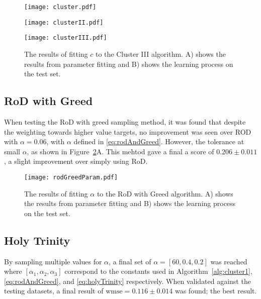 \begin{figure}[H]
    \begin{center}
        \texttt{[image: cluster.pdf]}
    \end{center}
\end{figure}
\begin{figure}[H]
    \begin{center}
        \texttt{[image: clusterII.pdf]}
    \end{center}
\end{figure}
\begin{figure}[H]
    \begin{center}
        \texttt{[image: clusterIII.pdf]}
        \caption[Cluster III]{The results of fitting $c$ to the Cluster III algorithm. A) shows the results from parameter fitting and B) shows the learning process on the test set.}
        \label{fig:clusterTest}
    \end{center}
\end{figure}

\subsection{RoD with Greed}
When testing the RoD with greed sampling method, it was found that despite the weighting towards higher value targets, no improvement was seen over ROD with $\alpha{}=0.06$, with $\alpha$ defined in \ref{eq:rodAndGreed}. However, the tolerance at small $\alpha$, as shown in Figure~\ref{fig:rogreed}A. This mehtod gave a final a score of ${0.206\pm{}0.011}$, a slight improvement over simply using RoD.

\begin{figure}[H]
    \begin{center}
        \texttt{[image: rodGreedParam.pdf]}
        \caption[RoD with Greed]{The results of fitting $\alpha{}$ to the RoD with Greed algorithm. A) shows the results from parameter fitting and B) shows the learning process on the test set.}
        \label{fig:rogreed}
    \end{center}
\end{figure}

\subsection{Holy Trinity}
By sampling multiple values for $\alpha$, a final set of $\alpha=[60, 0.4, 0.2]$ was reached where $[\alpha{}_1, \alpha{}_2, \alpha{}_3]$ correspond to the constants used in Algorithm~\ref{alg:cluster1}, \ref{eq:rodAndGreed}, and \ref{eq:holyTrinity} respectively. When validated against the testing datasets, a final result of $\mathrm{wmse}=0.116\pm{}0.014$ was found; the best result.

